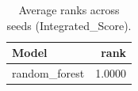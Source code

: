 \begin{table}[t]
\centering
\begin{tabular}{lr}
\toprule
Model & rank \\
\midrule
random_forest & 1.0000 \\
\bottomrule
\end{tabular}
\caption{Average ranks across seeds (Integrated_Score).}
\label{tab:avg_rank_Integrated_Score}
\end{table}